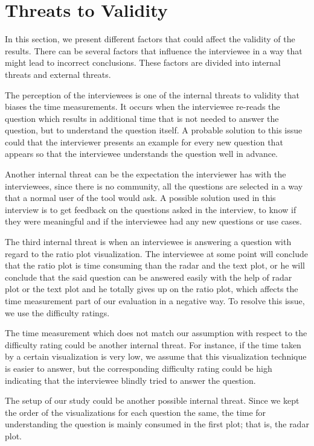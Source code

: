 \section{Threats to Validity}
\label{sec:4.6}
In this section, we present different factors that could affect the validity of the results. There can be several factors that influence the interviewee in a way that might lead to incorrect conclusions. These factors are divided into internal threats and external threats.

The perception of the interviewees is one of the internal threats to validity that biases the time measurements. It occurs when the interviewee re-reads the question which results in additional time that is not needed to answer the question, but to understand the question itself. A probable solution to this issue could that the interviewer presents an example for every new question that appears so that the interviewee understands the question well in advance. 

Another internal threat can be the expectation the interviewer has with the interviewees, since there is no community, all the questions are selected in a way that a normal user of the tool would ask. A possible solution used in this interview is to get feedback on the questions asked in the interview, to know if they were meaningful and if the interviewee had any new questions or use cases.

The third internal threat is when an interviewee is answering a question with regard to the ratio plot visualization. The interviewee at some point will conclude that the ratio plot is time consuming than the radar and the text plot, or he will conclude that the said question can be answered easily with the help of radar plot or the text plot and he totally gives up on the ratio plot, which affects the time measurement part of our evaluation in a negative way. To resolve this issue, we use the difficulty ratings. 

The time measurement which does not match our assumption with respect to the difficulty rating could be another internal threat. For instance, if the time taken by a certain visualization is very low, we assume that this visualization technique is easier to answer, but the corresponding difficulty rating could be high indicating that the interviewee blindly tried to answer the question.

The setup of our study could be another possible internal threat. Since we kept the order of the visualizations for each question the same, the time for understanding the question is mainly consumed in the first plot; that is, the radar plot.

